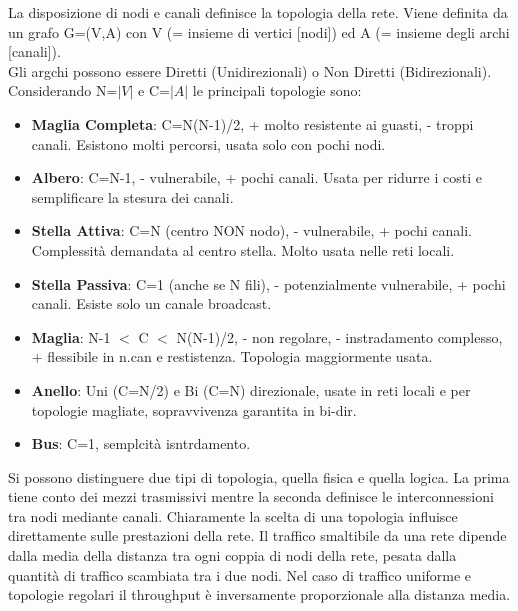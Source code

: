 \documentclass[12pt]{article}
\begin{document}
La disposizione di nodi e canali definisce la topologia della rete. Viene definita da un grafo G=(V,A) con V (= insieme di vertici [nodi]) ed A (= insieme degli archi [canali]).\\
Gli argchi possono essere Diretti (Unidirezionali) o Non Diretti (Bidirezionali).\\
Considerando N=$|V|$ e C=$|A|$ le principali topologie sono:
\begin{itemize}
  \item \textbf{Maglia Completa}: C=N(N-1)/2, + molto resistente ai guasti, - troppi canali. Esistono molti percorsi, usata solo con pochi nodi.
  \item \textbf{Albero}: C=N-1, - vulnerabile, + pochi canali. Usata per ridurre i costi e semplificare la stesura dei canali.
  \item \textbf{Stella Attiva}: C=N (centro NON nodo), - vulnerabile, + pochi canali. Complessità demandata al centro stella. Molto usata nelle reti locali.
  \item \textbf{Stella Passiva}: C=1 (anche se N fili), - potenzialmente vulnerabile, + pochi canali. Esiste solo un canale broadcast.
  \item \textbf{Maglia}: N-1 $<$ C $<$ N(N-1)/2, - non regolare, - instradamento complesso, + flessibile in n.can e restistenza. Topologia maggiormente usata.
  \item \textbf{Anello}: Uni (C=N/2) e Bi (C=N) direzionale, usate in reti locali e per topologie magliate, sopravvivenza garantita in bi-dir.
  \item \textbf{Bus}: C=1, semplcità isntrdamento.
\end{itemize}

Si possono distinguere due tipi di topologia, quella fisica e quella logica. La prima tiene conto dei mezzi trasmissivi mentre la seconda definisce le interconnessioni tra nodi mediante canali. Chiaramente la scelta di una topologia influisce direttamente sulle prestazioni della rete. Il traffico smaltibile da una rete dipende dalla media della distanza tra ogni coppia di nodi della rete, pesata dalla quantità di traffico scambiata tra i due nodi. Nel caso di traffico uniforme e topologie regolari il throughput è inversamente proporzionale alla distanza media.
\end{document}
